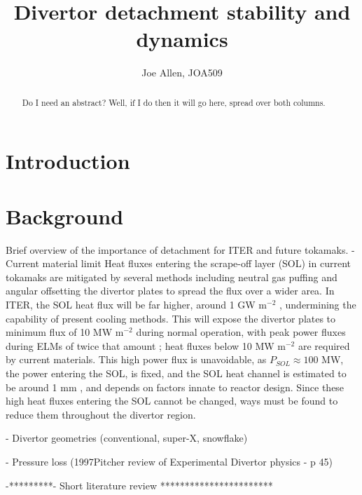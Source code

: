 \documentclass[12pt]{article}  %
\providecommand{\pow}[1]{{$^{#1}$}} %
\begin{document}
\title{Divertor detachment stability and dynamics}
\author{Joe Allen, JOA509}

    \maketitle
    \begin{abstract}
\noindent Do I need an abstract? Well, if I do then it will go here, spread over both columns. 
	\end{abstract}


\section{Introduction}\label{secIntro}

\section{Background}\label{secBg}
Brief overview of the importance of detachment for ITER and future tokamaks.
- Current material limit
Heat fluxes entering the scrape-off layer (SOL) in current tokamaks are mitigated by several methods including neutral gas puffing and angular offsetting the divertor plates to spread the flux over a wider area. In ITER, the SOL heat flux will be far higher, around 1 GW m\pow{-2} \cite{Loarte2007}, undermining the capability of present cooling methods. This will expose the divertor plates to minimum flux of 10 MW m\pow{-2} during normal operation, with peak power fluxes during ELMs of twice that amount \cite{Loarte2007}; heat fluxes below 10 MW m\pow{-2} are required by current materials. This high power flux is unavoidable, as $ P_{SOL} \approx 100$ MW, the power entering the SOL, is fixed, and the SOL heat channel is estimated to be around 1 mm \cite{Eich2013}, and depends on factors innate to reactor design. Since these high heat fluxes entering the SOL cannot be changed, ways must be found to reduce them throughout the divertor region.

- Divertor geometries (conventional, super-X, snowflake)

- Pressure loss (1997Pitcher review of Experimental Divertor physics - p 45)

-*********- Short literature review ***********************
\end{document}
